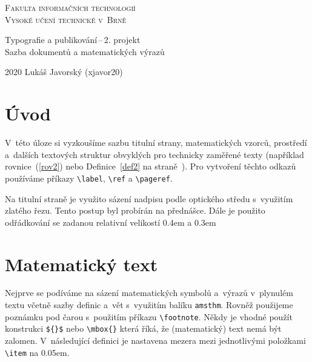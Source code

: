 \documentclass[a4paper,11pt,twocolumn]{article}
\begin{document}
\begin{titlepage}
\begin{center}

{\Huge \textsc{Fakulta informačních technologií\\
Vysoké učení technické v~Brně}}\\


{\LARGE
Typografie a publikování\,--\,2. projekt\\
Sazba dokumentů a matematických výrazů\\
}

\end{center}

{\LARGE 2020 \hfill Lukáš Javorský (xjavor20)}
\end{titlepage}

\section*{Úvod}
V~této úloze si vyzkoušíme sazbu titulní strany, ma\-te\-ma\-tic\-kých vzorců, prostředí a~dalších textových struktur ob\-vyk\-lých pro technicky zaměřené texty (například rovnice~(\ref{rov2})
nebo Definice~\ref{def2} na straně~\pageref{def2}). Pro vytvoření těchto odkazů
používáme příkazy \verb|\label|, \verb|\ref| a \verb|\pageref|.

Na titulní straně je využito sázení nadpisu podle optického středu s~využitím zlatého řezu. Tento postup byl
probírán na přednášce. Dále je použito odřádkování se
zadanou relativní velikostí 0.4em a 0.3em

\section{Matematický text}
Nejprve se podíváme na sázení matematických symbolů
a~výrazů v~plynulém textu včetně sazby definic a~vět s~využitím balíku \verb|amsthm|. Rovněž použijeme poznámku pod
čarou s~použitím příkazu \verb|\footnote|. Někdy je vhodné
použít konstrukci \verb|${}$| nebo \verb|\mbox{}| která říká, že
(matematický) text nemá být zalomen. V~následující definici je nastavena mezera mezi jednotlivými položkami
\verb|\item| na 0.05em.
\end{document}
